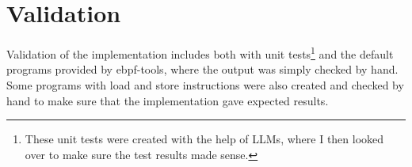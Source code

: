 \section{Validation}
Validation of the implementation includes both with unit tests\footnote{These
unit tests were created with the help of LLMs, where I then looked over to make
sure the test results made sense.} and the default programs provided by
ebpf-tools, where the output was simply checked by hand. Some programs with
load and store instructions were also created and checked by hand to make sure
that the implementation gave expected results.
